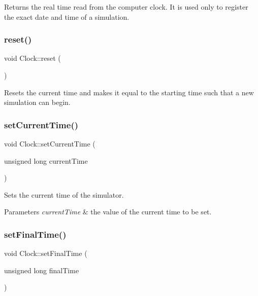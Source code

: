 \begin{DoxyReturn}{Returns}
the real time read from the computer clock. It is used only to register the exact date and time of a simulation. 
\end{DoxyReturn}
\mbox{\label{class_clock_a0ab5423b0a997aa13d7b6131c46d1358}} 
\subsubsection{\texorpdfstring{reset()}{reset()}}
{\footnotesize\ttfamily void Clock\+::reset (\begin{DoxyParamCaption}{ }\end{DoxyParamCaption})}

Resets the current time and makes it equal to the starting time such that a new simulation can begin. \mbox{\label{class_clock_a7046e8733ab749d3c24b3c61bd108d6c}} 
\subsubsection{\texorpdfstring{set\+Current\+Time()}{setCurrentTime()}}
{\footnotesize\ttfamily void Clock\+::set\+Current\+Time (\begin{DoxyParamCaption}\item[{unsigned long}]{current\+Time }\end{DoxyParamCaption})}

Sets the current time of the simulator. 
\begin{DoxyParams}{Parameters}
{\em current\+Time} & the value of the current time to be set. \\
\hline
\end{DoxyParams}
\mbox{\label{class_clock_a4780f83b55bc2539cd7069cfc4f06d99}} 
\subsubsection{\texorpdfstring{set\+Final\+Time()}{setFinalTime()}}
{\footnotesize\ttfamily void Clock\+::set\+Final\+Time (\begin{DoxyParamCaption}\item[{unsigned long}]{final\+Time }\end{DoxyParamCaption})}

